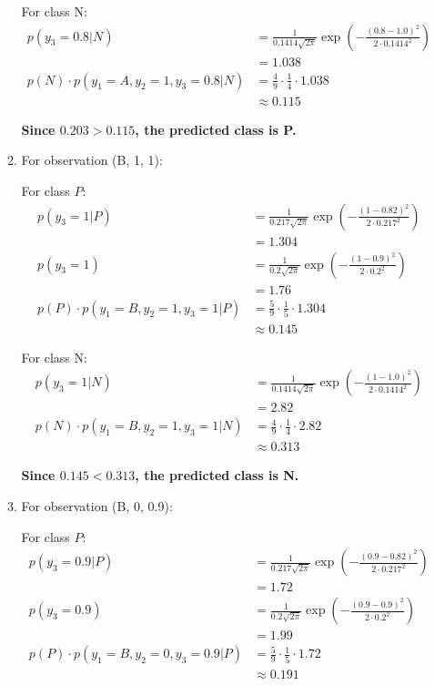 \documentclass{article}
\begin{document}
\begin{enumerate}[leftmargin=\labelsep]
\begin{enumerate}
  
  For class N:
  \begin{align*}
  p(y_3=0.8 | N) &= \frac{1}{0.1414 \sqrt{2\pi}} \exp\left(-\frac{(0.8 - 1.0)^2}{2 \cdot 0.1414^2}\right) \\[10pt]
  &= 1.038\\
  p(N) \cdot p(y_1 = A, y_2 = 1, y_3=0.8 | N)   &= \frac{4}{9} \cdot \frac{1}{4} \cdot 1.038 \\[10pt]
  &\approx 0.115
  \end{align*}
  
  \textbf{
  Since $0.203 > 0.115$, the predicted class is P.
  }

  \item For observation (B, 1, 1):
  
  For class \( P \):
  \begin{align*}
  p(y_3=1 | P) &= \frac{1}{0.217 \sqrt{2\pi}} \exp\left(-\frac{(1 - 0.82)^2}{2 \cdot 0.217^2}\right) \\[10pt]
  &=1.304 \\
  p(y_3=1) &= \frac{1}{0.2 \sqrt{2\pi}} \exp\left(-\frac{(1 - 0.9)^2}{2 \cdot 0.2^2}\right) \\[10pt]
  &= 1.76\\
  p(P) \cdot p(y_1 = B, y_2 = 1, y_3=1 | P) &= \frac{5}{9} \cdot \frac{1}{5} \cdot 1.304 \\[10pt]
  &\approx 0.145
  \end{align*}

  
  For class N:
  \begin{align*}
  p(y_3=1 | N) &= \frac{1}{0.1414 \sqrt{2\pi}} \exp\left(-\frac{(1 - 1.0)^2}{2 \cdot 0.1414^2}\right) \\[10pt]
  &= 2.82\\
  p(N) \cdot p(y_1 = B, y_2 = 1, y_3=1 | N) &= \frac{4}{9} \cdot \frac{1}{4} \cdot 2.82 \\[10pt]
  &\approx 0.313
  \end{align*}
  
  \textbf{
  Since $0.145 < 0.313$, the predicted class is N.
  }

  \item For observation (B, 0, 0.9):
  
  For class \( P \):
  \begin{align*}
  p(y_3=0.9 | P) &= \frac{1}{0.217 \sqrt{2\pi}} \exp\left(-\frac{(0.9 - 0.82)^2}{2 \cdot 0.217^2}\right) \\[10pt]
  &= 1.72\\
  p(y_3=0.9) &= \frac{1}{0.2 \sqrt{2\pi}} \exp\left(-\frac{(0.9 - 0.9)^2}{2 \cdot 0.2^2}\right) \\[10pt]
  &= 1.99\\
  p(P) \cdot p(y_1 = B, y_2 = 0, y_3=0.9 | P) &= \frac{5}{9} \cdot \frac{1}{5} \cdot 1.72 \\[10pt]
  &\approx 0.191
  \end{align*}


\end{enumerate}
\end{enumerate}
\end{document}
